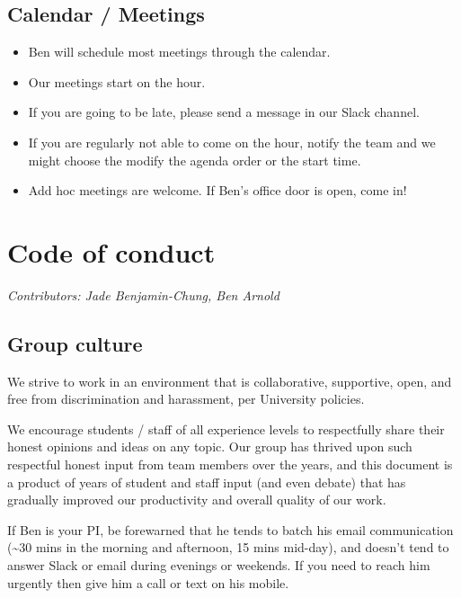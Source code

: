 \documentclass[]{book}
\providecommand{\tightlist}{%
  \setlength{\itemsep}{0pt}\setlength{\parskip}{0pt}}
\begin{document}
\hypertarget{calendar-meetings}{%
\section{Calendar / Meetings}\label{calendar-meetings}}

\begin{itemize}
\tightlist
\item
  Ben will schedule most meetings through the calendar.
\item
  Our meetings start on the hour.
\item
  If you are going to be late, please send a message in our Slack channel.
\item
  If you are regularly not able to come on the hour, notify the team and we might choose the modify the agenda order or the start time.
\item
  Add hoc meetings are welcome. If Ben's office door is open, come in!
\end{itemize}

\hypertarget{code-of-conduct}{%
\chapter{Code of conduct}\label{code-of-conduct}}

\emph{Contributors: Jade Benjamin-Chung, Ben Arnold}

\hypertarget{group-culture}{%
\section{Group culture}\label{group-culture}}

We strive to work in an environment that is collaborative, supportive, open, and free from discrimination and harassment, per University policies.

We encourage students / staff of all experience levels to respectfully share their honest opinions and ideas on any topic. Our group has thrived upon such respectful honest input from team members over the years, and this document is a product of years of student and staff input (and even debate) that has gradually improved our productivity and overall quality of our work.

If Ben is your PI, be forewarned that he tends to batch his email communication (\textasciitilde{}30 mins in the morning and afternoon, 15 mins mid-day), and doesn't tend to answer Slack or email during evenings or weekends. If you need to reach him urgently then give him a call or text on his mobile.
\end{document}
